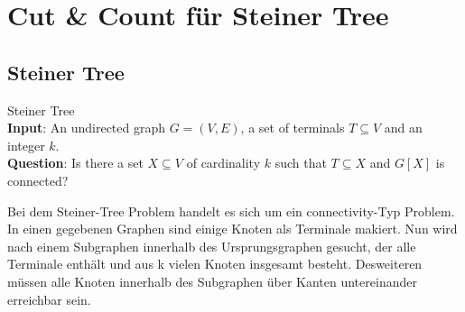 %
%
%
\chapter{Cut \& Count für Steiner Tree}
\label{c:cc_steiner}

\section{Steiner Tree}
\label{sec:steiner}
\begin{definition}
Steiner Tree\\
\textbf{Input}: An undirected graph $G = (V, E)$, a set of terminals $T \subseteq V$ and an integer $k$. \\
\textbf{Question}: Is there a set $X \subseteq V$ of cardinality $k$ such that $T \subseteq X$ and $G[X]$ is connected?
\end{definition}

Bei dem Steiner-Tree Problem handelt es sich um ein connectivity-Typ Problem. In einen gegebenen Graphen sind einige Knoten als Terminale makiert. Nun wird nach einem Subgraphen innerhalb des Ursprungsgraphen gesucht, der alle Terminale enthält und aus k vielen Knoten insgesamt besteht. Desweiteren müssen alle Knoten innerhalb des Subgraphen über Kanten untereinander erreichbar sein.

